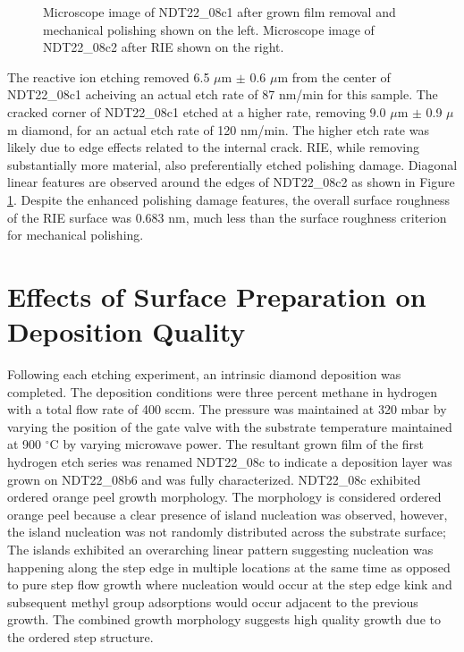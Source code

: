 \begin{figure}
    \centering
    
    \caption{Microscope image of NDT22\_08c1 after grown film removal and mechanical polishing shown on the left. Microscope image of NDT22\_08c2 after RIE shown on the right.}
    \label{fig:RIEDICM}
\end{figure}

The reactive ion etching removed 6.5 $\mu$m $\pm$ 0.6 $\mu$m from the center of NDT22\_08c1 acheiving an actual etch rate of 87 nm/min for this sample. The cracked corner of NDT22\_08c1 etched at a higher rate, removing 9.0 $\mu$m $\pm$ 0.9 $\mu$m diamond, for an actual etch rate of 120 nm/min. The higher etch rate was likely due to edge effects related to the internal crack. RIE, while removing substantially more material, also preferentially etched polishing damage. Diagonal linear features are observed around the edges of NDT22\_08c2 as shown in Figure \ref{fig:RIEDICM}. Despite the enhanced polishing damage features, the overall surface roughness of the RIE surface was 0.683 nm, much less than the surface roughness criterion for mechanical polishing. 

\section{Effects of Surface Preparation on Deposition Quality}
\indent

Following each etching experiment, an intrinsic diamond deposition was completed. The deposition conditions were three percent methane in hydrogen with a total flow rate of 400 sccm. The pressure was maintained at 320 mbar by varying the position of the gate valve with the substrate temperature maintained at 900 $^\circ$C by varying microwave power. The resultant grown film of the first hydrogen etch series was renamed NDT22\_08c to indicate a deposition layer was grown on NDT22\_08b6 and was fully characterized. NDT22\_08c exhibited ordered orange peel growth morphology. The morphology is considered ordered orange peel because a clear presence of island nucleation was observed, however, the island nucleation was not randomly distributed across the substrate surface; The islands exhibited an overarching linear pattern suggesting nucleation was happening along the step edge in multiple locations at the same time as opposed to pure step flow growth where nucleation would occur at the step edge kink and subsequent methyl group adsorptions would occur adjacent to the previous growth. The combined growth morphology suggests high quality growth due to the ordered step structure. 

